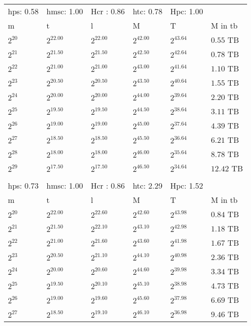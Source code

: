 \begin{tabular}{llllll}
hps: 0.58 & hmsc: 1.00 & Hcr : 0.86 & htc: 0.78 & Hpc: 1.00 &  \\
m & t & l & M & T & M in tb \\
$2^{20}$ & $2^{22.00}$ & $2^{22.00}$ & $2^{42.00}$ & $2^{43.64}$ & $0.55$ TB \\
$2^{21}$ & $2^{21.50}$ & $2^{21.50}$ & $2^{42.50}$ & $2^{42.64}$ & $0.78$ TB \\
$2^{22}$ & $2^{21.00}$ & $2^{21.00}$ & $2^{43.00}$ & $2^{41.64}$ & $1.10$ TB \\
$2^{23}$ & $2^{20.50}$ & $2^{20.50}$ & $2^{43.50}$ & $2^{40.64}$ & $1.55$ TB \\
$2^{24}$ & $2^{20.00}$ & $2^{20.00}$ & $2^{44.00}$ & $2^{39.64}$ & $2.20$ TB \\
$2^{25}$ & $2^{19.50}$ & $2^{19.50}$ & $2^{44.50}$ & $2^{38.64}$ & $3.11$ TB \\
$2^{26}$ & $2^{19.00}$ & $2^{19.00}$ & $2^{45.00}$ & $2^{37.64}$ & $4.39$ TB \\
$2^{27}$ & $2^{18.50}$ & $2^{18.50}$ & $2^{45.50}$ & $2^{36.64}$ & $6.21$ TB \\
$2^{28}$ & $2^{18.00}$ & $2^{18.00}$ & $2^{46.00}$ & $2^{35.64}$ & $8.78$ TB \\
$2^{29}$ & $2^{17.50}$ & $2^{17.50}$ & $2^{46.50}$ & $2^{34.64}$ & $12.42$ TB \\
 &  &  &  &  &  \\
hps: 0.73 & hmsc: 1.00 & Hcr : 0.86 & htc: 2.29 & Hpc: 1.52 &  \\
m & t & l & M & T & M in tb \\
$2^{20}$ & $2^{22.00}$ & $2^{22.60}$ & $2^{42.60}$ & $2^{43.98}$ & $0.84$ TB \\
$2^{21}$ & $2^{21.50}$ & $2^{22.10}$ & $2^{43.10}$ & $2^{42.98}$ & $1.18$ TB \\
$2^{22}$ & $2^{21.00}$ & $2^{21.60}$ & $2^{43.60}$ & $2^{41.98}$ & $1.67$ TB \\
$2^{23}$ & $2^{20.50}$ & $2^{21.10}$ & $2^{44.10}$ & $2^{40.98}$ & $2.36$ TB \\
$2^{24}$ & $2^{20.00}$ & $2^{20.60}$ & $2^{44.60}$ & $2^{39.98}$ & $3.34$ TB \\
$2^{25}$ & $2^{19.50}$ & $2^{20.10}$ & $2^{45.10}$ & $2^{38.98}$ & $4.73$ TB \\
$2^{26}$ & $2^{19.00}$ & $2^{19.60}$ & $2^{45.60}$ & $2^{37.98}$ & $6.69$ TB \\
$2^{27}$ & $2^{18.50}$ & $2^{19.10}$ & $2^{46.10}$ & $2^{36.98}$ & $9.46$ TB \\

\end{tabular}
